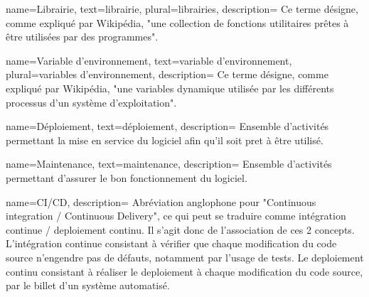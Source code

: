{
    name={Librairie},
    text={librairie},
    plural={librairies},
    description={
        Ce terme désigne, comme expliqué par Wikipédia\cite{libraryDef}, "une collection de fonctions utilitaires prêtes à être utilisées par des programmes".
    }
}

{
    name={Variable d'environnement},
    text={variable d'environnement},
    plural={variables d'environnement},
    description={
        Ce terme désigne, comme expliqué par Wikipédia\cite{envvarDef}, "une variables dynamique utilisée par les différents processus d’un système d’exploitation".
    }
}

{
    name={Déploiement},
    text={déploiement},
    description={
        Ensemble d'activités permettant la mise en service du logiciel afin qu'il soit pret à être utilisé.
    }
}

{
    name={Maintenance},
    text={maintenance},
    description={
        Ensemble d'activités permettant d'assurer le bon fonctionnement du logiciel.
    }
}

{
    name={CI/CD},
    description={
        Abréviation anglophone pour "Continuous integration / Continuous Delivery", ce qui peut se traduire comme intégration continue / \gls{deploiement} continu.
        Il s'agit donc de l'association de ces 2 concepts.
        L'intégration continue consistant à vérifier que chaque modification du code source n'engendre pas de défauts, notamment par l'usage de tests.
        Le \gls{deploiement} continu consistant à réaliser le \gls{deploiement} à chaque modification du code source, par le billet d'un système automatisé.
    }
}